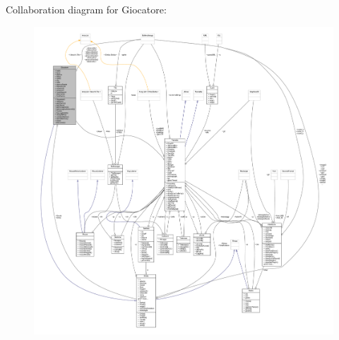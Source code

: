 Collaboration diagram for Giocatore\+:
\nopagebreak
\begin{figure}[H]
\begin{center}
\leavevmode
\includegraphics[width=350pt]{class_entita_1_1_giocatore__coll__graph}
\end{center}
\end{figure}
